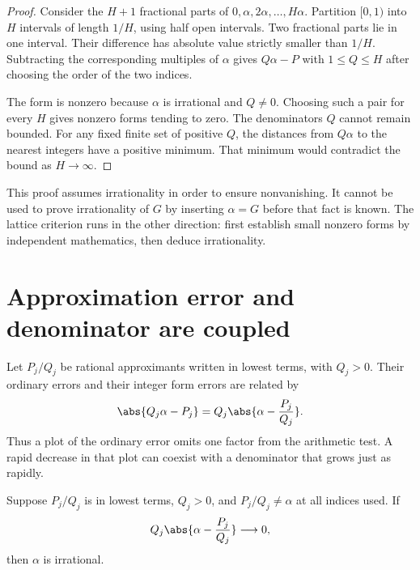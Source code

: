 \begin{proof}
Consider the $H+1$ fractional parts of $0,\alpha,2\alpha,\ldots,H\alpha$. Partition $[0,1)$ into $H$ intervals of length $1/H$, using half open intervals. Two fractional parts lie in one interval. Their difference has absolute value strictly smaller than $1/H$. Subtracting the corresponding multiples of $\alpha$ gives $Q\alpha-P$ with $1\leq Q\leq H$ after choosing the order of the two indices.

The form is nonzero because $\alpha$ is irrational and $Q\ne0$. Choosing such a pair for every $H$ gives nonzero forms tending to zero. The denominators $Q$ cannot remain bounded. For any fixed finite set of positive $Q$, the distances from $Q\alpha$ to the nearest integers have a positive minimum. That minimum would contradict the bound as $H\to\infty$.
\end{proof}

This proof assumes irrationality in order to ensure nonvanishing. It cannot be used to prove irrationality of $G$ by inserting $\alpha=G$ before that fact is known. The lattice criterion runs in the other direction: first establish small nonzero forms by independent mathematics, then deduce irrationality.

\section{Approximation error and denominator are coupled}

Let $P_j/Q_j$ be rational approximants written in lowest terms, with $Q_j>0$. Their ordinary errors and their integer form errors are related by
\begin{equation}
\abs{Q_j\alpha-P_j}
=Q_j\abs{\alpha-\frac{P_j}{Q_j}}.
\label{eq:c02-error-conversion}
\end{equation}
Thus a plot of the ordinary error omits one factor from the arithmetic test. A rapid decrease in that plot can coexist with a denominator that grows just as rapidly.

\begin{corollary}
\label{cor:c02-reduced}
Suppose $P_j/Q_j$ is in lowest terms, $Q_j>0$, and $P_j/Q_j\ne\alpha$ at all indices used. If
\begin{equation}
Q_j\abs{\alpha-\frac{P_j}{Q_j}}\longrightarrow0,
\label{eq:c02-reduced-condition}
\end{equation}
then $\alpha$ is irrational.
\end{corollary}

